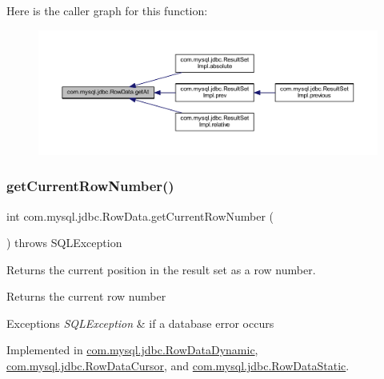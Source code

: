 Here is the caller graph for this function\+:
\nopagebreak
\begin{figure}[H]
\begin{center}
\leavevmode
\includegraphics[width=350pt]{interfacecom_1_1mysql_1_1jdbc_1_1_row_data_a25cc7589897136ff05959212ce3e9063_icgraph}
\end{center}
\end{figure}
\mbox{\label{interfacecom_1_1mysql_1_1jdbc_1_1_row_data_aec8ec45fafa52ded12507aa708efbdf7}} 
\subsubsection{\texorpdfstring{get\+Current\+Row\+Number()}{getCurrentRowNumber()}}
{\footnotesize\ttfamily int com.\+mysql.\+jdbc.\+Row\+Data.\+get\+Current\+Row\+Number (\begin{DoxyParamCaption}{ }\end{DoxyParamCaption}) throws S\+Q\+L\+Exception}

Returns the current position in the result set as a row number.

\begin{DoxyReturn}{Returns}
the current row number 
\end{DoxyReturn}

\begin{DoxyExceptions}{Exceptions}
{\em S\+Q\+L\+Exception} & if a database error occurs \\
\hline
\end{DoxyExceptions}


Implemented in \mbox{\hyperlink{classcom_1_1mysql_1_1jdbc_1_1_row_data_dynamic_a41a9e435a520104e0e4ff6d89717702d}{com.\+mysql.\+jdbc.\+Row\+Data\+Dynamic}}, \mbox{\hyperlink{classcom_1_1mysql_1_1jdbc_1_1_row_data_cursor_aaa74825dc4ae9b34d7b36e8aec089227}{com.\+mysql.\+jdbc.\+Row\+Data\+Cursor}}, and \mbox{\hyperlink{classcom_1_1mysql_1_1jdbc_1_1_row_data_static_a199a2308d1218dbf9807a32158e307f4}{com.\+mysql.\+jdbc.\+Row\+Data\+Static}}.

